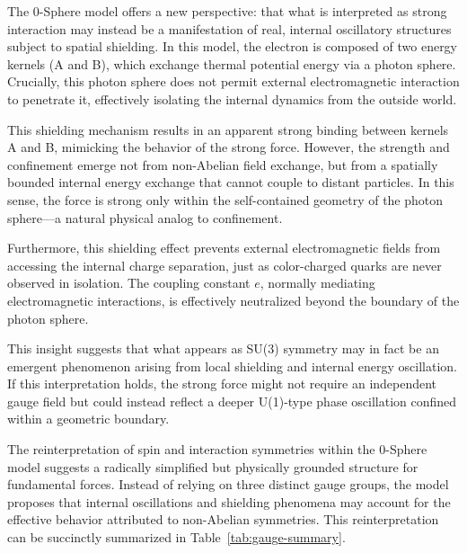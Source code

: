 \documentclass[12pt,letterpaper]{article} %
\begin{document}
The 0-Sphere model offers a new perspective: that what is interpreted as strong interaction may instead be a manifestation of real, internal oscillatory structures subject to spatial shielding. In this model, the electron is composed of two energy kernels (A and B), which exchange thermal potential energy via a photon sphere. Crucially, this photon sphere does not permit external electromagnetic interaction to penetrate it, effectively isolating the internal dynamics from the outside world.

This shielding mechanism results in an apparent strong binding between kernels A and B, mimicking the behavior of the strong force. However, the strength and confinement emerge not from non-Abelian field exchange, but from a spatially bounded internal energy exchange that cannot couple to distant particles. In this sense, the force is strong only within the self-contained geometry of the photon sphere—a natural physical analog to confinement.

Furthermore, this shielding effect prevents external electromagnetic fields from accessing the internal charge separation, just as color-charged quarks are never observed in isolation. The coupling constant \( e \), normally mediating electromagnetic interactions, is effectively neutralized beyond the boundary of the photon sphere.

This insight suggests that what appears as SU(3) symmetry may in fact be an emergent phenomenon arising from local shielding and internal energy oscillation. If this interpretation holds, the strong force might not require an independent gauge field but could instead reflect a deeper U(1)-type phase oscillation confined within a geometric boundary.

The reinterpretation of spin and interaction symmetries within the 0-Sphere model suggests a radically simplified but physically grounded structure for fundamental forces. Instead of relying on three distinct gauge groups, the model proposes that internal oscillations and shielding phenomena may account for the effective behavior attributed to non-Abelian symmetries. This reinterpretation can be succinctly summarized in Table~\ref{tab:gauge-summary}.
\end{document}
